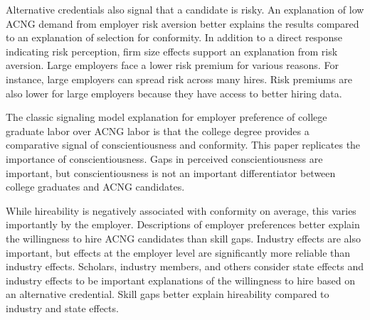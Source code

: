 \documentclass[review]{elsarticle}
\begin{document}
Alternative credentials also signal that a candidate is risky.
An explanation of low ACNG demand from employer risk aversion better explains the results
compared to an explanation of selection for conformity.
In addition to a direct response indicating risk perception, firm size effects support an explanation from risk aversion.
Large employers face a lower risk premium for various reasons.
For instance, large employers can spread risk across many hires.
Risk premiums are also lower for large employers because they have access to better hiring data.

The classic signaling model explanation for employer preference of college graduate labor over ACNG labor is that
the college degree provides a comparative signal of conscientiousness and conformity.
This paper replicates the importance of conscientiousness.
Gaps in perceived conscientiousness are important,
but conscientiousness is not an important differentiator between college graduates and ACNG candidates.

While hireability is negatively associated with conformity on average, this varies importantly by the employer.
Descriptions of employer preferences better explain the willingness to hire ACNG candidates than skill gaps.
Industry effects are also important, but effects at the employer level are significantly more reliable than industry effects.
Scholars, industry members,
and others consider state effects
and industry effects to be important explanations of the willingness to hire based on an alternative credential.
Skill gaps better explain hireability compared to industry and state effects.

\end{document}
